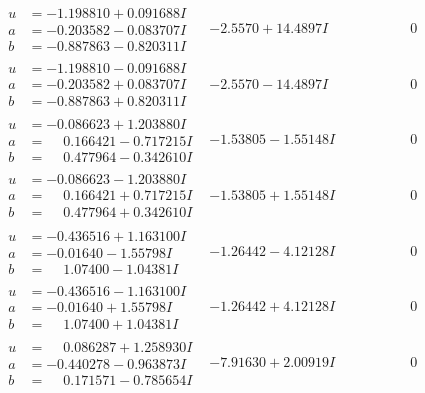 \documentclass[1p]{elsarticle_modified}
\theoremstyle{definition}
\begin{document}
$$\begin{array}{c|c|c}
\begin{aligned}
u &= -1.198810 + 0.091688 I \\
a &= -0.203582 - 0.083707 I \\
b &= -0.887863 - 0.820311 I\end{aligned}
 & -2.5570 + 14.4897 I & \phantom{-0.000000 } 0 \\ \hline\begin{aligned}
u &= -1.198810 - 0.091688 I \\
a &= -0.203582 + 0.083707 I \\
b &= -0.887863 + 0.820311 I\end{aligned}
 & -2.5570 - 14.4897 I & \phantom{-0.000000 } 0 \\ \hline\begin{aligned}
u &= -0.086623 + 1.203880 I \\
a &= \phantom{-}0.166421 - 0.717215 I \\
b &= \phantom{-}0.477964 - 0.342610 I\end{aligned}
 & -1.53805 - 1.55148 I & \phantom{-0.000000 } 0 \\ \hline\begin{aligned}
u &= -0.086623 - 1.203880 I \\
a &= \phantom{-}0.166421 + 0.717215 I \\
b &= \phantom{-}0.477964 + 0.342610 I\end{aligned}
 & -1.53805 + 1.55148 I & \phantom{-0.000000 } 0 \\ \hline\begin{aligned}
u &= -0.436516 + 1.163100 I \\
a &= -0.01640 - 1.55798 I \\
b &= \phantom{-}1.07400 - 1.04381 I\end{aligned}
 & -1.26442 - 4.12128 I & \phantom{-0.000000 } 0 \\ \hline\begin{aligned}
u &= -0.436516 - 1.163100 I \\
a &= -0.01640 + 1.55798 I \\
b &= \phantom{-}1.07400 + 1.04381 I\end{aligned}
 & -1.26442 + 4.12128 I & \phantom{-0.000000 } 0 \\ \hline\begin{aligned}
u &= \phantom{-}0.086287 + 1.258930 I \\
a &= -0.440278 - 0.963873 I \\
b &= \phantom{-}0.171571 - 0.785654 I\end{aligned}
 & -7.91630 + 2.00919 I & \phantom{-0.000000 } 0 \\ \hline\begin{aligned}

\end{aligned}
\end{array}$$
\end{document}

